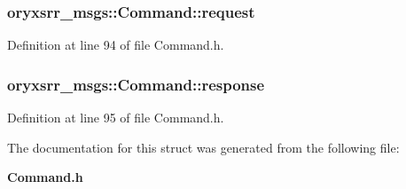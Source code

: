 \subsubsection[{request}]{ {\bf oryxsrr\-\_\-msgs\-::\-Command\-::request}}\label{structoryxsrr__msgs_1_1Command_ad4f68bfe41fda983a7e073d6e55074d0}


\-Definition at line 94 of file \-Command.\-h.

\subsubsection[{response}]{ {\bf oryxsrr\-\_\-msgs\-::\-Command\-::response}}\label{structoryxsrr__msgs_1_1Command_a138b1002b734cf0e48d7cb79a6b4a292}


\-Definition at line 95 of file \-Command.\-h.



\-The documentation for this struct was generated from the following file\-:\begin{DoxyCompactItemize}
\item 
{\bf \-Command.\-h}\end{DoxyCompactItemize}
